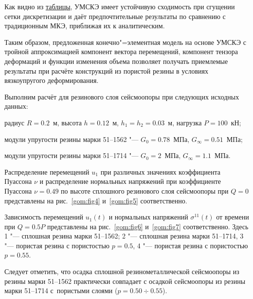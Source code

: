 Как видно из \hyperlink{gom:table}{таблицы}, УМСКЭ имеет устойчивую сходимость при сгущении сетки дискретизации и даёт предпочтительные результаты по сравнению с традиционным МКЭ, приближая их к аналитическим.



Таким образом, предложенная конечно"=элементная модель на основе УМСКЭ с тройной аппроксимацией компонент вектора перемещений, компонент тензора деформаций и функции изменения объема позволяет получать приемлемые результаты при расчёте конструкций из пористой резины в условиях вязкоупругого деформирования.







 



Выполним расчёт для резинового слоя сейсмоопоры при следующих исходных данных: 

радиус $R=0.2$~м, высота $h=0.12$~м, $h_{1}=h_{2}=0.03$~м, нагрузка $P=100$~кН; 

модули упругости резины марки 51--1562 "--- $G_{0}=0.78$~МПа, $G_{\infty}=0.51$~МПа;

модули упругости  резины марки 51--1714 "--- $G_{0}=2$~МПа, $G_{\infty}=1.1$~МПа.

 

Распределение перемещений $u_{1}$ при различных значениях коэффициента Пуассона $\nu$ и распределение нормальных напряжений при коэффициенте Пуассона $\nu=0.49$ по высоте сплошного резинового слоя сейсмоопоры при $Q=0$ представлены на рис.~\ref{gom:fig4} и~\ref{gom:fig5} соответственно.











Зависимость перемещений $u_{1}(t)$ и нормальных напряжений  $\sigma^{11}(t)$ от времени при $Q=0.5P$ представлены на рис.~\ref{gom:fig6} и~\ref{gom:fig7} соответственно. Здесь  1 "--- сплошная резина марки 51--1562;  2 "--- сплошная резина марки 51--1714, 3 "--- пористая резина с пористостью $p=0.5$, 4 "--- пористая резина с пористостью $p=0.55$.



Следует отметить, что осадка сплошной резинометаллической сейсмоопоры из резины марки 51--1562 практически совпадает с осадкой сейсмоопоры из резины марки 51--1714 с~пористыми слоями ($p=0.50\div0.55$). 

